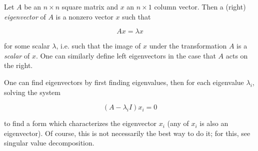 \documentclass[12pt]{article}
\begin{document}
Let $A$ be an $n \times n$ square matrix and $x$ an $n\times 1$ column vector. Then a (right) \emph{eigenvector} of $A$ is a nonzero vector $x$ such that

$$ Ax = \lambda x $$

for some scalar $\lambda$, i.e. such that the image of $x$ under the transformation $A$ is a \emph{scalar } of $x$.  One can similarly define left eigenvectors in the case that $A$ acts on the right.

One can find eigenvectors by first finding eigenvalues, then for each eigenvalue $\lambda_i$, solving the system

$$ (A-\lambda_i I) x_i = 0 $$

to find a form which characterizes the eigenvector $x_i$ (any  of $x_i$ is also an eigenvector).  Of course, this is not necessarily the best way to do it; for this, see  singular value decomposition.
\end{document}
